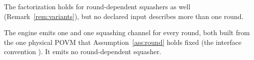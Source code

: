 
The factorization holds for round-dependent squashers as well
(Remark~\ref{rem:variants}), but no declared input describes more than one
round.

\begin{requirement}\label{req:round-homogeneous-emission}
The engine emits one  and one squashing channel for
every round, both built from the one physical POVM that
Assumption~\ref{ass:round} holds fixed (the interface convention
). It emits no round-dependent squasher.
\end{requirement}
